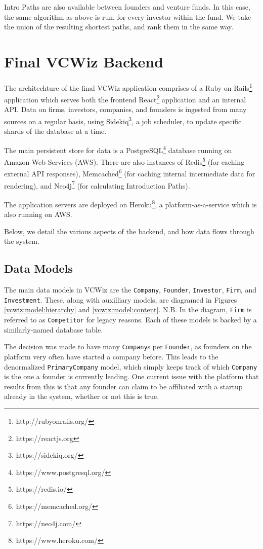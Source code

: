 Intro Paths are also available between founders and venture funds. In this case, the same algorithm as above is run, for every investor within the fund. We take the union of the resulting shortest paths, and rank them in the same way.

\section{Final VCWiz Backend}

The architechture of the final VCWiz application comprises of a Ruby on Rails\footnote{http://rubyonrails.org/} application which serves both the frontend React\footnote{https://reactjs.org} application and an internal API. Data on firms, investors, companies, and founders is ingested from many sources on a regular basis, using Sidekiq\footnote{https://sidekiq.org/}, a job scheduler, to update specific shards of the database at a time.


The main persistent store for data is a PostgreSQL\footnote{https://www.postgresql.org/} database running on Amazon Web Services (AWS). There are also instances of Redis\footnote{https://redis.io/} (for caching external API responses), Memcached\footnote{https://memcached.org/} (for caching internal intermediate data for rendering), and Neo4j\footnote{https://neo4j.com/} (for calculating Introduction Paths).

The application servers are deployed on Heroku\footnote{https://www.heroku.com/}, a platform-as-a-service which is also running on AWS.

Below, we detail the various aspects of the backend, and how data flows through the system.

\subsection{Data Models}

The main data models in VCWiz are the \texttt{Company}, \texttt{Founder}, \texttt{Investor}, \texttt{Firm}, and \texttt{Investment}. These, along with auxilliary models, are diagramed in Figures \ref{vcwiz:model:hierarchy} and \ref{vcwiz:model:content}. N.B. In the diagram, \texttt{Firm} is referred to as \texttt{Competitor} for legacy reasons. Each of these models is backed by a similarly-named database table.

The decision was made to have many \texttt{Company}s per \texttt{Founder}, as founders on the platform very often have started a company before. This leads to the denormalized \texttt{PrimaryCompany} model, which simply keeps track of which \texttt{Company} is the one a founder is currently leading. One current issue with the platform that results from this is that any founder can claim to be affiliated with a startup already in the system, whether or not this is true.

